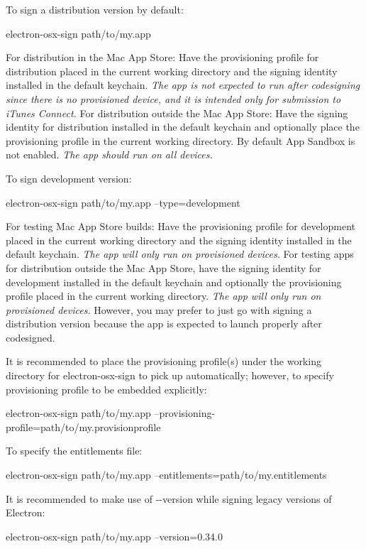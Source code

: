 \begin{DoxyItemize}
\item To sign a distribution version by default\+: 
\begin{DoxyCode}
electron-osx-sign path/to/my.app
\end{DoxyCode}
 For distribution in the Mac App Store\+: Have the provisioning profile for distribution placed in the current working directory and the signing identity installed in the default keychain. {\itshape The app is not expected to run after codesigning since there is no provisioned device, and it is intended only for submission to i\+Tunes Connect.} For distribution outside the Mac App Store\+: Have the signing identity for distribution installed in the default keychain and optionally place the provisioning profile in the current working directory. By default App Sandbox is not enabled. {\itshape The app should run on all devices.}
\item To sign development version\+: 
\begin{DoxyCode}
electron-osx-sign path/to/my.app --type=development
\end{DoxyCode}
 For testing Mac App Store builds\+: Have the provisioning profile for development placed in the current working directory and the signing identity installed in the default keychain. {\itshape The app will only run on provisioned devices.} For testing apps for distribution outside the Mac App Store, have the signing identity for development installed in the default keychain and optionally the provisioning profile placed in the current working directory. {\itshape The app will only run on provisioned devices.} However, you may prefer to just go with signing a distribution version because the app is expected to launch properly after codesigned.
\item It is recommended to place the provisioning profile(s) under the working directory for {\ttfamily electron-\/osx-\/sign} to pick up automatically; however, to specify provisioning profile to be embedded explicitly\+: 
\begin{DoxyCode}
electron-osx-sign path/to/my.app --provisioning-profile=path/to/my.provisionprofile
\end{DoxyCode}

\item To specify the entitlements file\+: 
\begin{DoxyCode}
electron-osx-sign path/to/my.app --entitlements=path/to/my.entitlements
\end{DoxyCode}

\item It is recommended to make use of {\ttfamily -\/-\/version} while signing legacy versions of Electron\+: 
\begin{DoxyCode}
electron-osx-sign path/to/my.app --version=0.34.0
\end{DoxyCode}

\end{DoxyItemize}

